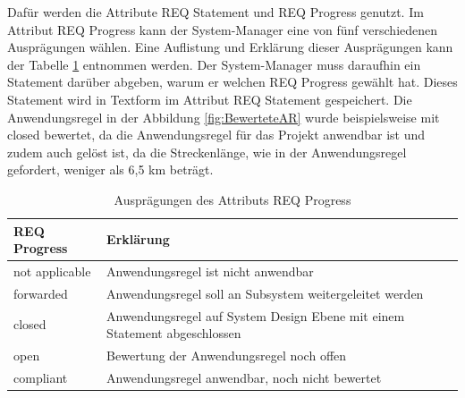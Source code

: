 Dafür werden die Attribute REQ Statement und REQ Progress genutzt. Im Attribut REQ Progress kann der System-Manager eine von fünf verschiedenen
Ausprägungen wählen. Eine Auflistung und Erklärung dieser Ausprägungen kann der Tabelle \ref*{tab:REQProgress} entnommen werden. Der 
System-Manager muss daraufhin ein Statement darüber abgeben, warum er welchen REQ Progress gewählt hat. Dieses Statement wird in Textform im
Attribut REQ Statement gespeichert. Die Anwendungsregel in der Abbildung \ref*{fig:BewerteteAR} wurde beispielsweise mit closed bewertet,
da die Anwendungsregel für das Projekt anwendbar ist und zudem auch gelöst ist, da die Streckenlänge, wie in der Anwendungsregel gefordert,
weniger als 6,5 km beträgt.

\begin{table}[H]
    \begin{center}
        \caption{Ausprägungen des Attributs REQ Progress \cite[vgl. S.28f.]{SMO-AR}}
        \label{tab:REQProgress}
        \begin{tabularx}{\textwidth}{|l|>{\raggedright\arraybackslash}X |}
            \hline
            \textbf{REQ Progress} & \textbf{Erklärung}\\ \hline
            not applicable & Anwendungsregel ist nicht anwendbar \\ \hline
            forwarded & Anwendungsregel soll an Subsystem weitergeleitet werden \\ \hline
            closed & Anwendungsregel auf System Design Ebene mit einem Statement abgeschlossen \\ \hline
            open &  Bewertung der Anwendungsregel noch offen \\ \hline
            compliant & Anwendungsregel anwendbar, noch nicht bewertet \\ \hline
        \end{tabularx}
    \end{center}
\end{table}